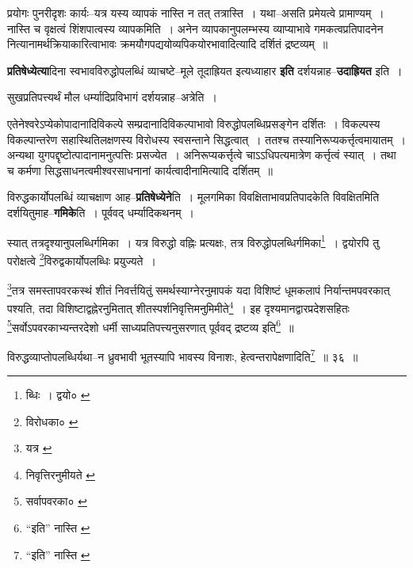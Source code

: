\documentclass[article,12pt,a4paper]{memoir}
\begin{document}
	  \pstart प्रयोगः पुनरीदृशः कार्यः--यत्र यस्य व्यापकं नास्ति न तत् तत्रास्ति । यथा--असति प्रमेयत्वे प्रामाण्यम् । नास्ति च वृक्षत्वं शिंशपात्वस्य व्यापकमिति । अनेन व्यापकानुपलम्भस्य व्याप्याभावे गमकत्वप्रतिपादनेन नित्यानामर्थक्रियाकारित्वाभावः क्रमयौगपद्ययोव्यपिकयोरभावादित्यादि दर्शितं द्रष्टव्यम् ॥
	\pend
      

	  \pstart \textbf{प्रतिषेध्येत्या}दिना स्वभावविरुद्धोपलब्धिं व्याचष्टे--मूले तूदाह्रियत इत्यध्याहार \textbf{इति} दर्शयन्नाह--\textbf{उदाह्रियत} इति ।
	\pend
      

	  \pstart सुखप्रतिपत्त्यर्थं मौल धर्म्यादिप्रविभागं दर्शयन्नाह--अत्रेति ।
	\pend
      

	  \pstart एतेनेश्वरेऽप्येकोपादानादिविकल्पे सम्प्रदानादिविकल्पाभावो विरुद्धोपलब्धिप्रसङ्गेन दर्शितः । विकल्पस्य विकल्पान्तरेण सहास्थितिलक्षणस्य विरोधस्य स्वसन्ताने सिद्धत्वात् । ततश्च तस्यानिरूप्यकर्त्तृत्वमायातम् । अन्यथा युगपद्दृष्टोत्पादानामनुत्पत्तिः प्रसज्येत । अनिरूप्यकर्त्तृत्वे चाऽऽधिपत्यमात्रेण कर्त्तृत्वं स्यात् । तथा च कर्मणा सिद्धसाधनत्वमीश्वरसाधनानां कार्यत्वादीनामित्यादि दर्शितम् ॥
	\pend
      

	  \pstart विरुद्धकार्योपलब्धिं व्याचक्षाण आह--\textbf{प्रतिषेध्येने}ति । मूलगमिका विवक्षिताभावप्रतिपादकेति विवक्षितमिति दर्शयितुमाह--\textbf{गमिके}ति । पूर्ववद् धर्म्यादिकथनम् ।
	\pend
	  \bigskip
	  \begingroup
	

	  \pstart स्यात् तत्रदृश्यानुपलब्धिर्गमिका । यत्र विरुद्धो वह्निः प्रत्यक्षः, तत्र विरुद्धोपलब्धिर्गमिका\footnote{ब्धिः । द्वयो० \cite{dp-msA} \cite{dp-msB} \cite{dp-edP} \cite{dp-edH} \cite{dp-edE} \cite{dp-edN}} । द्वयोरपि तु परोक्षत्वे \footnote{विरोधका० \cite{dp-msA}}\-विरुद्वकार्योपलब्धिः प्रयुज्यते ।
	\pend
       

	  \pstart \footnote{यत्र \cite{dp-msA}}\-तत्र समस्तापवरकस्थं शीतं निवर्त्तयितुं समर्थस्याग्नेरनुमापकं यदा विशिष्टं धूमकलापं निर्यान्तमपवरकात् पश्यति, तदा विशिष्टाद्वह्नेरनुमितात् शीतस्पर्शनिवृत्तिमनुमिमीते\footnote{निवृत्तिरनुमीयते \cite{dp-msA} \cite{dp-msC}} । इह दृश्यमानद्वारप्रदेशसहितः \footnote{सर्वापवरका० \cite{dp-msA} \cite{dp-edP} \cite{dp-edH} \cite{dp-edE} \cite{dp-edN}}\-सर्वोऽपवरकाभ्यन्तरदेशो धर्मी साध्यप्रतिपत्त्यनुसरणात् पूर्ववद् द्रष्टव्य इति\footnote{“इति” नास्ति \cite{dp-msA} \cite{dp-msB} \cite{dp-msC} \cite{dp-edP} \cite{dp-edH} \cite{dp-edE} \cite{dp-edN}} ॥
	\pend
       
	  \bigskip
	  \begingroup
	

	  \pstart विरुद्धव्याप्तोपलब्धिर्यथा--न ध्रुवभावी भूतस्यापि भावस्य विनाशः, हेत्वन्तरापेक्षणादिति\footnote{“इति” नास्ति \cite{dp-edE}} ॥ ३६ ॥
	\pend
      
\end{document}

